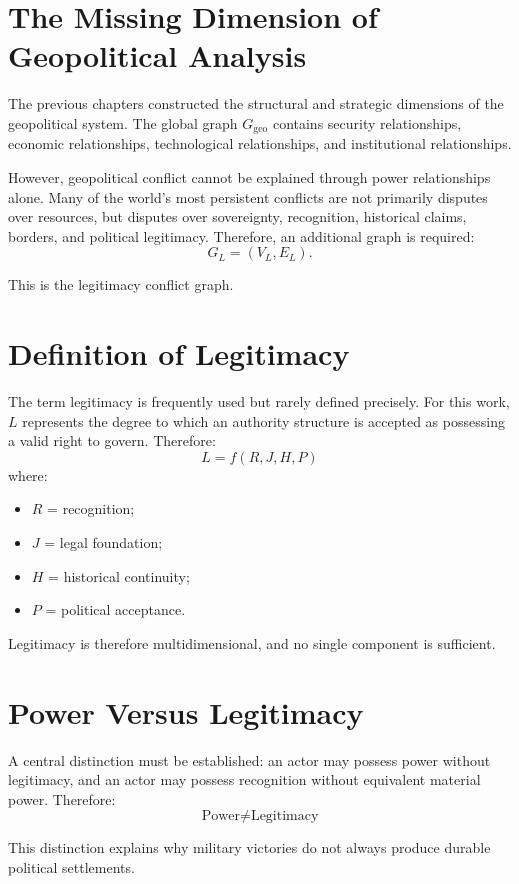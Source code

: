 \documentclass[11pt,openany]{book}
\theoremstyle{plain}
\theoremstyle{definition}
\begin{document}
\section*{The Missing Dimension of Geopolitical Analysis}

The previous chapters constructed the structural and strategic dimensions of the geopolitical system. The global graph \(G_{\text{geo}}\) contains security relationships, economic relationships, technological relationships, and institutional relationships.

However, geopolitical conflict cannot be explained through power relationships alone. Many of the world's most persistent conflicts are not primarily disputes over resources, but disputes over sovereignty, recognition, historical claims, borders, and political legitimacy. Therefore, an additional graph is required:
\[
\boxed{
G_L = (V_L, E_L).
}
\]

This is the legitimacy conflict graph.

\section*{Definition of Legitimacy}

The term legitimacy is frequently used but rarely defined precisely. For this work, \(L\) represents the degree to which an authority structure is accepted as possessing a valid right to govern. Therefore:
\[
L = f(R, J, H, P)
\]
where:
\begin{itemize}
\item \(R\) = recognition;
\item \(J\) = legal foundation;
\item \(H\) = historical continuity;
\item \(P\) = political acceptance.
\end{itemize}

Legitimacy is therefore multidimensional, and no single component is sufficient.

\section*{Power Versus Legitimacy}

A central distinction must be established: an actor may possess power without legitimacy, and an actor may possess recognition without equivalent material power. Therefore:
\[
\boxed{
\text{Power} \neq \text{Legitimacy}
}
\]

This distinction explains why military victories do not always produce durable political settlements.
\end{document}
